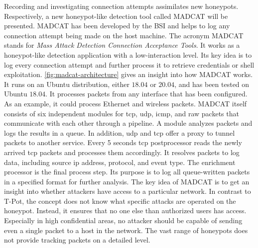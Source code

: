 Recording and investigating connection attempts assimilates new honeypots.
Respectively, a new honeypot-like detection tool called MADCAT will be presented.
MADCAT has been developed by the BSI and helps to log any connection attempt being made on the host machine.
The acronym MADCAT stands for \textit{Mass Attack Detection Connection Acceptance Tools}.
It works as a honeypot-like detection application with a low-interaction level.
Its key idea is to log every connection attempt and further process it to retrieve credentials or shell exploitation.
\autoref{fig:madcat-architecture} gives an insight into how MADCAT works.
It runs on an Ubuntu distribution, either $18.04$ or $20.04$, and has been tested on Ubuntu $18.04$.
It processes packets from any interface that has been configured.
As an example, it could process Ethernet and wireless packets.
MADCAT itself consists of six independent modules for \ac{tcp}, \ac{udp}, \ac{icmp}, and raw packets that communicate with each other through a pipeline.
A module analyzes packets and logs the results in a queue.
In addition, \ac{udp} and \ac{tcp} offer a proxy to tunnel packets to another service.
Every 5 seconds \ac{tcp} postprocessor reads the newly arrived \ac{tcp} packets and processes them accordingly.
It resolves packets to log data, including source \ac{ip} address, protocol, and event type.
The enrichment processor is the final process step.
Its purpose is to log all queue-written packets in a specified format for further analysis.
The key idea of MADCAT is to get an insight into whether attackers have access to a particular network.
In contrast to T-Pot, the concept does not know what specific attacks are operated on the honeypot.
Instead, it ensures that no one else than authorized users has access.
Especially in high confidential areas, no attacker should be capable of sending even a single packet to a host in the network.
The vast range of honeypots does not provide tracking packets on a detailed level.

